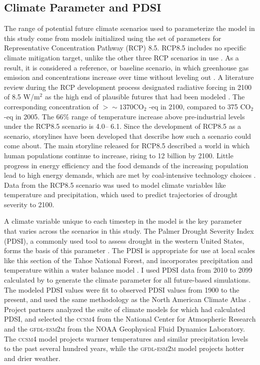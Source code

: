 \subsection{Climate Parameter and PDSI}

The range of potential future climate scenarios used to parameterize the model in this study come from models initialized using the set of parameters for Representative Concentration Pathway (RCP) 8.5. RCP8.5 includes no specific climate mitigation target, unlike the other three RCP scenarios in use \citep{Riahi2011}. As a result, it is considered a reference, or baseline scenario, in which greenhouse gas emission and concentrations increase over time without leveling out \citep{Riahi2011}. A literature review during the RCP development process designated radiative forcing in 2100 of 8.5 W/m$^2$ as the high end of plausible futures that had been modeled \citep{VanVuuren2011}. The corresponding concentration of $>\sim 1370 \text{CO}_2$ -eq in 2100, compared to 375 $\text{CO}_2$ -eq in 2005. The 66\% range of temperature increase above pre-industrial levels under the RCP8.5 scenario is 4.0\textdegree -- 6.1\textdegree \citep{Rogelj2012}. Since the development of RCP8.5 as a scenario, storylines have been developed that describe how such a scenario could come about. The main storyline released for RCP8.5 described a world in which human populations continue to increase, rising to 12 billion by 2100. Little progress in energy efficiency and the food demands of the increasing population lead to high energy demands, which are met by coal-intensive technology choices \citep{Riahi2011}. Data from the RCP8.5 scenario was used to model climate variables like temperature and precipitation, which \citet{Cook2014} used to predict trajectories of drought severity to 2100.

A climate variable unique to each timestep in the model is the key parameter that varies across the scenarios in this study. The Palmer Drought Severity Index (PDSI), a commonly used tool to assess drought in the western United States, forms the basis of this parameter \citep{Cook2004,Cook2004}. The PDSI is appropriate for use at local scales like this section of the Tahoe National Forest, and incorporates precipitation and temperature within a water balance model \citep{HeimJr2002}. I used PDSI data from 2010 to 2099 calculated by \citet{Cook2014} to generate the climate parameter for all future-based simulations. The \citet{Cook2014} modeled PDSI values were fit to observed PDSI values from 1900 to the present, and used the same methodology as the North American Climate Atlas \citep{Cook2004}. Project partners analyzed the suite of climate models for which \citet{Cook2014} had calculated PDSI, and selected the \textsc{ccsm4} from the National Center for Atmospheric Research and the \textsc{gfdl-esm2m} from the NOAA Geophysical Fluid Dynamics Laboratory. The \textsc{ccsm4} model projects warmer temperatures and similar precipitation levels to the past several hundred years, while the \textsc{gfdl-esm2m} model projects hotter and drier weather.

